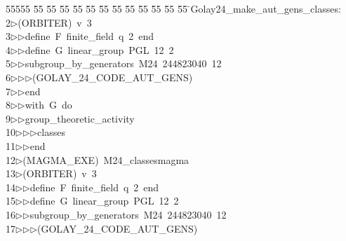 %
%
\begin{tabbing}
55555 \= 55 \= 55 \= 55 \= 55 \= 55 \= 55 \= 55 \= 55 \= 55 \= 55 \= 55 \= 55 \= \>Golay24\_make\_aut\_gens\_classes:\\[0pt]
2\>$\triangleright$\>(ORBITER)\ v\ 3\ \\[0pt]
3\>$\triangleright$\>$\triangleright$\>define\ F\ finite\_field\ q\ 2\ end\ \\[0pt]
4\>$\triangleright$\>$\triangleright$\>define\ G\ linear\_group\ PGL\ 12\ 2\ \\[0pt]
5\>$\triangleright$\>$\triangleright$\>subgroup\_by\_generators\ M24\ 244823040\ 12\ \\[0pt]
6\>$\triangleright$\>$\triangleright$\>$\triangleright$\>(GOLAY\_24\_CODE\_AUT\_GENS)\ \\[0pt]
7\>$\triangleright$\>$\triangleright$\>end\ \\[0pt]
8\>$\triangleright$\>$\triangleright$\>with\ G\ do\ \\[0pt]
9\>$\triangleright$\>$\triangleright$\>group\_theoretic\_activity\ \\[0pt]
10\>$\triangleright$\>$\triangleright$\>$\triangleright$\>classes\ \\[0pt]
11\>$\triangleright$\>$\triangleright$\>end\\[0pt]
12\>$\triangleright$\>(MAGMA\_EXE)\ M24\_classesmagma\\[0pt]
13\>$\triangleright$\>(ORBITER)\ v\ 3\ \\[0pt]
14\>$\triangleright$\>$\triangleright$\>define\ F\ finite\_field\ q\ 2\ end\ \\[0pt]
15\>$\triangleright$\>$\triangleright$\>define\ G\ linear\_group\ PGL\ 12\ 2\ \\[0pt]
16\>$\triangleright$\>$\triangleright$\>subgroup\_by\_generators\ M24\ 244823040\ 12\ \\[0pt]
17\>$\triangleright$\>$\triangleright$\>$\triangleright$\>(GOLAY\_24\_CODE\_AUT\_GENS)\ \\[0pt]

\end{tabbing}
